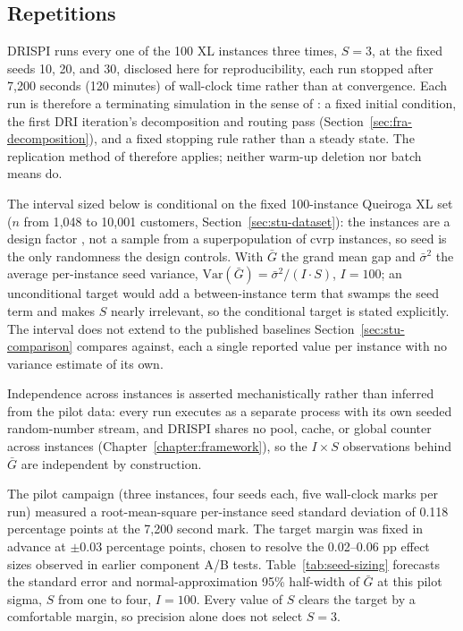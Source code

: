 \subsection{Repetitions}\label{sec:stu-repetitions}
DRISPI runs every one of the 100 XL instances three times, $S=3$, at the fixed seeds 10, 20, and 30, disclosed here for reproducibility, each run stopped after 7{,}200 seconds (120 minutes) of wall-clock time rather than at convergence. Each run is therefore a terminating simulation in the sense of \citet{lawSimulationModelingAnalysis2000}: a fixed initial condition, the first DRI iteration's decomposition and routing pass (Section~\ref{sec:fra-decomposition}), and a fixed stopping rule rather than a steady state. The replication method of \citet[ch.~9]{lawSimulationModelingAnalysis2000} therefore applies; neither warm-up deletion nor batch means do.

The interval sized below is conditional on the fixed 100-instance Queiroga XL set ($n$ from 1{,}048 to 10{,}001 customers, Section~\ref{sec:stu-dataset}): the instances are a design factor \citep{queirogaXLInstancesCapacitated2026}, not a sample from a superpopulation of \gls{cvrp} instances, so seed is the only randomness the design controls. With $\bar G$ the grand mean gap and $\bar\sigma^2$ the average per-instance seed variance, $\mathrm{Var}(\bar G) = \bar\sigma^2/(I \cdot S)$, $I=100$; an unconditional target would add a between-instance term that swamps the seed term and makes $S$ nearly irrelevant, so the conditional target is stated explicitly. The interval does not extend to the published baselines Section~\ref{sec:stu-comparison} compares against, each a single reported value per instance with no variance estimate of its own.

Independence across instances is asserted mechanistically rather than inferred from the pilot data: every run executes as a separate process with its own seeded random-number stream, and DRISPI shares no pool, cache, or global counter across instances (Chapter~\ref{chapter:framework}), so the $I \times S$ observations behind $\bar G$ are independent by construction.

The pilot campaign (three instances, four seeds each, five wall-clock marks per run) measured a root-mean-square per-instance seed standard deviation of 0.118 percentage points at the 7{,}200 second mark. The target margin was fixed in advance at $\pm 0.03$ percentage points, chosen to resolve the 0.02--0.06 pp effect sizes observed in earlier component A/B tests. Table~\ref{tab:seed-sizing} forecasts the standard error and normal-approximation 95\% half-width of $\bar G$ at this pilot sigma, $S$ from one to four, $I=100$. Every value of $S$ clears the target by a comfortable margin, so precision alone does not select $S=3$.

